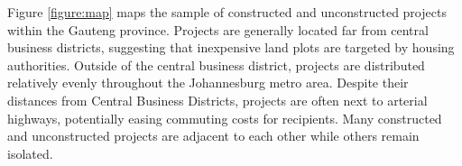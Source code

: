 \documentclass[12pt]{article}
\begin{document}
Figure \ref{figure:map} maps the sample of constructed and unconstructed projects within the Gauteng province.  Projects are generally located far from central business districts, suggesting that inexpensive land plots are targeted by housing authorities.  Outside of the central business district, projects are distributed relatively evenly throughout the Johannesburg metro area.  Despite their distances from Central Business Districts, projects are often next to arterial highways, potentially easing commuting costs for recipients.  Many constructed and unconstructed projects are adjacent to each other while others remain isolated.  




\end{document}
